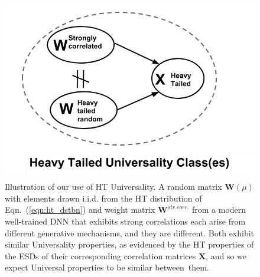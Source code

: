 


\begin{figure}[t]  %
   \centering
   \includegraphics[scale=0.36]{img/universality_classes.png} 
   \caption{Illustration of our use of HT Universality.  
            A random matrix $\mathbf{W}(\mu)$ with elements drawn i.i.d. from the HT distribution of Eqn.~(\ref{eqn:ht_dstbn}) and weight matrix $\mathbf{W}^{str. corr.}$ from a modern well-trained DNN that exhibits strong correlations each arise from different generative mechanisms, and they are different.  Both exhibit similar Universality properties, as evidenced by the HT properties of the ESDs of their corresponding correlation matrices $\mathbf{X}$, and so we expect Universal properties to be similar between~them.}
   \label{fig:universality_diagram}
\end{figure}



